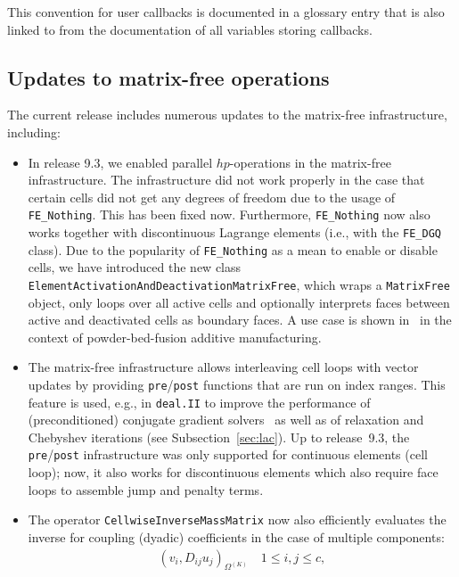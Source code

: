 \documentclass{ansarticle-preprint}
\newcommand{\specialword}[1]{\texttt{#1}}
\newcommand{\dealii}{{\specialword{deal.II}}\xspace}
\begin{document}
This convention for user callbacks is documented in a glossary entry
that is also linked to from the documentation of all variables storing
callbacks.


\subsection{Updates to matrix-free operations}\label{sec:mf}

The current release includes numerous updates to the matrix-free
infrastructure, including:
\begin{itemize}
\item In release 9.3, we enabled parallel $hp$-operations in the matrix-free infrastructure.
The infrastructure did not work properly in the case that certain cells
did not get any degrees of freedom due to the usage of \texttt{FE\_Nothing}. This has been
fixed now. Furthermore, \texttt{FE\_Nothing} now also works together
with discontinuous Lagrange elements (i.e., with the \texttt{FE\_DGQ} class). Due to the popularity of \texttt{FE\_Nothing} as a mean to enable
or disable cells, we have introduced the new class
\texttt{ElementActivationAndDeactivationMatrixFree}, which wraps a \texttt{MatrixFree} object, only loops over all
active cells and optionally interprets faces between active and deactivated cells
as boundary faces. A use case is shown in~\cite{proell2023highly} in the context of powder-bed-fusion additive
manufacturing.
\item The matrix-free infrastructure allows interleaving cell loops with vector updates
by providing \texttt{pre}/\texttt{post} functions that are run on index ranges. This
feature is used, e.g., in \dealii to improve the performance of (preconditioned)
conjugate gradient solvers~\cite{kronbichler2022cg} as well as of relaxation and Chebyshev iterations (see Subsection~\ref{sec:lac}).
Up to release~9.3, the \texttt{pre}/\texttt{post} infrastructure was only supported for
continuous elements (cell loop); now, it also works for discontinuous
elements which also require face loops to assemble jump and penalty terms.
\item The operator \texttt{CellwiseInverseMassMatrix} now also efficiently
evaluates the inverse for coupling (dyadic) coefficients in the case of  multiple
components:
\begin{align*}
\left(v_i, D_{ij} u_j  \right)_{\Omega^{(K)}}
\quad  1\le i,j \le c,
\end{align*}

\end{itemize}
\end{document}
